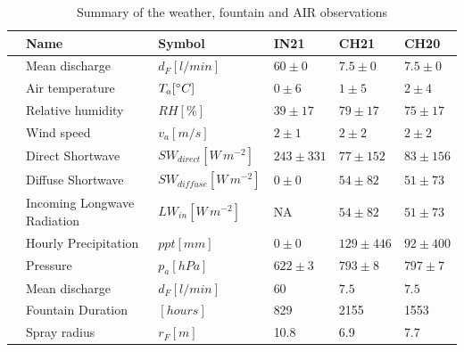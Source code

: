 \documentclass[utf8]{frontiersSCNS} %
\begin{document}
\begin{table}
	\centering
	\caption{ Summary of the weather, fountain and AIR observations}
	\label{tab:Observations}
	\begin{tabular}{@{}|llllll|@{}}
		\toprule
		\textbf{}              & \textbf{Name}               & \textbf{Symbol}           & \textbf{IN21} & \textbf{CH21} & \textbf{CH20} \\ \midrule
		\multicolumn{1}{|l|}{\multirow{7}{*}{\rotatebox[origin=c]{90}{Weather}}}
		                       & Mean discharge              & $d_F [l/min]        $     & $60 \pm 0$    & $7.5 \pm 0$   & $7.5 \pm 0$   \\
		\multicolumn{1}{|l|}{} & Air temperature             & $T_a [\degree C]    $     & $0 \pm 6$     & $1 \pm 5$     & $2 \pm 4$     \\
		\multicolumn{1}{|l|}{} & Relative humidity           & $RH  [\%]        $        & $39 \pm 17$   & $79 \pm 17$   & $75 \pm 17$   \\
		\multicolumn{1}{|l|}{} & Wind speed                  & $v_a [m/s]        $       & $2 \pm 1$     & $2 \pm 2$     & $2 \pm 2$     \\
		\multicolumn{1}{|l|}{} & Direct Shortwave            & $SW_{direct} [W\,m^{-2}]$ & $243 \pm 331$ & $77 \pm 152$  & $83 \pm 156$  \\
		\multicolumn{1}{|l|}{} & Diffuse Shortwave           & $SW_{diffuse}[W\,m^{-2}]$ & $0 \pm 0$     & $54 \pm82$    & $51 \pm 73$   \\
		\multicolumn{1}{|l|}{} & Incoming Longwave Radiation & $LW_{in}[W\,m^{-2}]$      & NA            & $54 \pm82$    & $51 \pm 73$   \\
		\multicolumn{1}{|l|}{} & Hourly Precipitation        & $ppt [mm]       $         & $0 \pm 0$     & $129 \pm 446$ & $92 \pm 400$  \\
		\multicolumn{1}{|l|}{} & Pressure                    & $p_a [hPa]        $       & $622 \pm 3$   & $793 \pm 8$   & $797 \pm7$    \\\bottomrule
		\multicolumn{1}{|l|}{\multirow{3}{*}{\rotatebox[origin=c]{90}{Fountain}}}
		                       & Mean discharge              & $d_F [l/min]     $        & $60$          & $7.5$         & $7.5$         \\
		\multicolumn{1}{|l|}{} & Fountain Duration           & $[hours]$                 & 829           & 2155          & 1553          \\
		\multicolumn{1}{|l|}{} & Spray radius                & $r_{F} [m]$               & 10.8          & 6.9           & 7.7           \\\midrule

\end{tabular}
\end{table}
\end{document}
